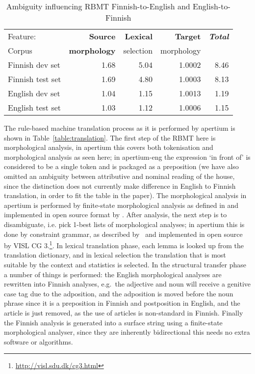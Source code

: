 \documentclass[11pt,a4paper]{article}
\begin{document}
\begin{table*}
    \begin{center}
    \begin{tabular}{lrrrr}
        \toprule
        \hfill Feature: & \bf Source & \bf Lexical & \bf
        Target & \bf \it Total\\
        Corpus & \bf morphology & selection & morphology & \\
        \midrule
        Finnish dev set & 1.68 & 5.04 & 1.0002 & 8.46 \\
        Finnish test set & 1.69 & 4.80 & 1.0003 & 8.13 \\
        \midrule
        English dev set & 1.04 & 1.15 & 1.0013 & 1.19 \\
        English test set & 1.03 & 1.12 & 1.0006 & 1.15\\
        \bottomrule
    \end{tabular}
    \caption{Ambiguity influencing RBMT Finnish-to-English and
    English-to-Finnish\label{table:ambiguities}}
    \end{center}
\end{table*}

The rule-based machine translation process as it is performed by apertium is shown
in Table~\ref{table:translation}. The first step of the RBMT here is morphological
analysis, in apertium this covers both tokenisation and morphological analysis as seen here;
in apertium-eng 
the expression `in front of' is considered to be a single token and is packaged
as a preposition (we have also omitted an ambiguity between attributive and nominal
reading of the house, since the distinction does not currently make difference in English
to Finnish translation, in order to fit the table in the paper). The morphological analysis in
apertium is performed by finite-state morphological analysis as defined in \citet{beesley2003finite} and
implemented in open source format by \citet{linden2011hfst}.
After analysis, the next
step is to disambiguate,
i.e. pick 1-best lists of morphological analyses; in apertium this is done by constraint 
grammar, as described by~\citet{karlsson1990constraint} and implemented in open source by VISL CG 3.\footnote{\url{http://visl.sdu.dk/cg3.html}}. In lexical translation phase, each lemma is looked
up from the translation dictionary, and in lexical selection the translation that
is most suitable by the context and statistics is selected. In the structural transfer phase a number of things
is performed:
the English morphological analyses are rewritten into Finnish analyses, e.g.\  the adjective and noun will receive a genitive case tag
due to the adposition, and the adposition is moved before the noun phrase since it is a preposition in Finnish and
postposition in English, and the article is just removed, as the use of articles is non-standard in Finnish.
Finally the Finnish analysis is generated into a surface string using a finite-state morphological analyser, since
they are inherently bidirectional this needs no extra software or algorithms.
\end{document}
